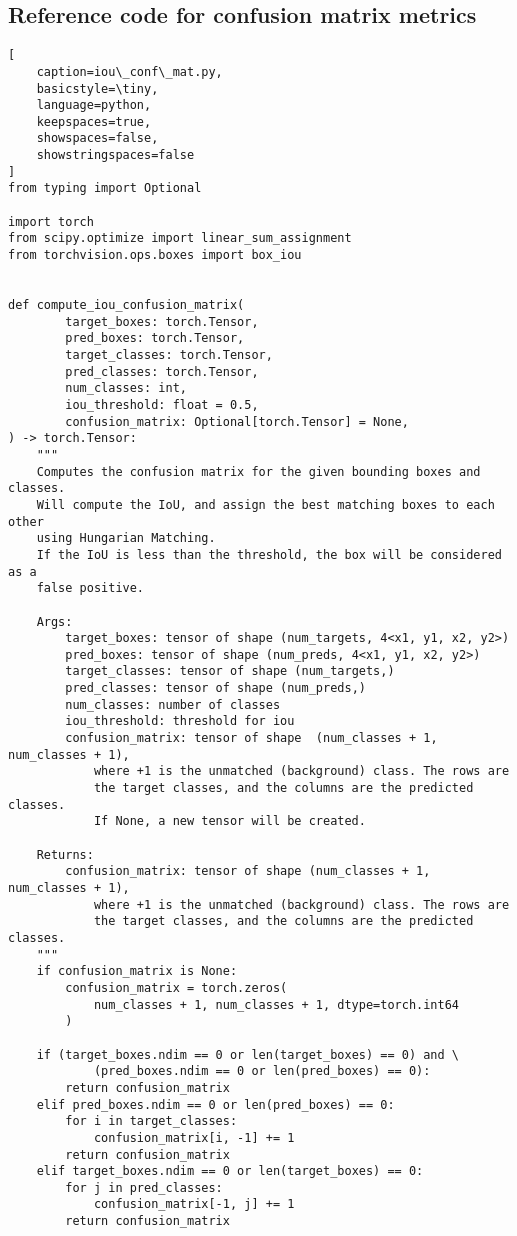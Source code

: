\subsection{Reference code for confusion matrix metrics}

\begin{lstlisting}[
    caption=iou\_conf\_mat.py,
    basicstyle=\tiny,
    language=python,
    keepspaces=true,
    showspaces=false,
    showstringspaces=false
]
from typing import Optional

import torch
from scipy.optimize import linear_sum_assignment
from torchvision.ops.boxes import box_iou


def compute_iou_confusion_matrix(
        target_boxes: torch.Tensor,
        pred_boxes: torch.Tensor,
        target_classes: torch.Tensor,
        pred_classes: torch.Tensor,
        num_classes: int,
        iou_threshold: float = 0.5,
        confusion_matrix: Optional[torch.Tensor] = None,
) -> torch.Tensor:
    """
    Computes the confusion matrix for the given bounding boxes and classes.
    Will compute the IoU, and assign the best matching boxes to each other
    using Hungarian Matching.
    If the IoU is less than the threshold, the box will be considered as a
    false positive.

    Args:
        target_boxes: tensor of shape (num_targets, 4<x1, y1, x2, y2>)
        pred_boxes: tensor of shape (num_preds, 4<x1, y1, x2, y2>)
        target_classes: tensor of shape (num_targets,)
        pred_classes: tensor of shape (num_preds,)
        num_classes: number of classes
        iou_threshold: threshold for iou
        confusion_matrix: tensor of shape  (num_classes + 1, num_classes + 1),
            where +1 is the unmatched (background) class. The rows are 
            the target classes, and the columns are the predicted classes.
            If None, a new tensor will be created.
    
    Returns:
        confusion_matrix: tensor of shape (num_classes + 1, num_classes + 1),
            where +1 is the unmatched (background) class. The rows are 
            the target classes, and the columns are the predicted classes.
    """
    if confusion_matrix is None:
        confusion_matrix = torch.zeros(
            num_classes + 1, num_classes + 1, dtype=torch.int64
        )

    if (target_boxes.ndim == 0 or len(target_boxes) == 0) and \
            (pred_boxes.ndim == 0 or len(pred_boxes) == 0):
        return confusion_matrix
    elif pred_boxes.ndim == 0 or len(pred_boxes) == 0:
        for i in target_classes:
            confusion_matrix[i, -1] += 1
        return confusion_matrix
    elif target_boxes.ndim == 0 or len(target_boxes) == 0:
        for j in pred_classes:
            confusion_matrix[-1, j] += 1
        return confusion_matrix


\end{lstlisting}
